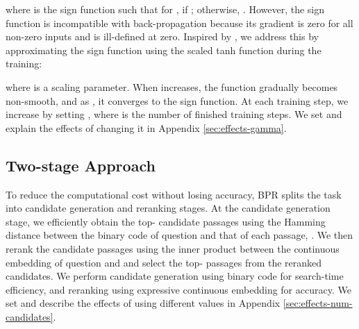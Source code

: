 \documentclass[11pt,a4paper]{article}
\begin{document}
where  is the sign function such that for ,  if ; otherwise, .
However, the sign function is incompatible with back-propagation because its gradient is zero for all non-zero inputs and is ill-defined at zero.
Inspired by \citet{Cao2017HashNet:Continuation}, we address this by approximating the sign function using the scaled tanh function during the training:

where  is a scaling parameter.
When  increases, the function gradually becomes non-smooth, and as , it converges to the sign function.
At each training step, we increase  by setting , where  is the number of finished training steps.
We set  and explain the effects of changing it in Appendix \ref{sec:effects-gamma}.

\subsection{Two-stage Approach}
\label{subsec:approach}
To reduce the computational cost without losing accuracy, BPR splits the task into candidate generation and reranking stages.
At the candidate generation stage, we efficiently obtain the top- candidate passages using the Hamming distance between the binary code of question  and that of each passage, .
We then rerank the  candidate passages using the inner product between the continuous embedding of question  and  and select the top- passages from the reranked candidates.
We perform candidate generation using binary code  for search-time efficiency, and reranking using expressive continuous embedding  for accuracy.
We set  and describe the effects of using different  values in Appendix \ref{sec:effects-num-candidates}.
\end{document}
